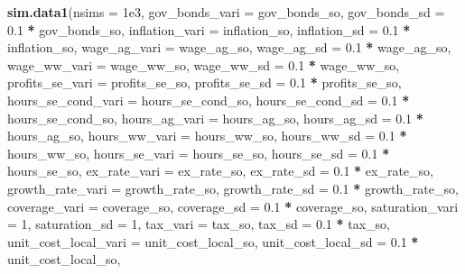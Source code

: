 \documentclass[]{article}
\newenvironment{Shaded}{\begin{snugshade}}{\end{snugshade}}
\newcommand{\DataTypeTok}[1]{\textcolor[rgb]{0.13,0.29,0.53}{#1}}
\newcommand{\DecValTok}[1]{\textcolor[rgb]{0.00,0.00,0.81}{#1}}
\newcommand{\FloatTok}[1]{\textcolor[rgb]{0.00,0.00,0.81}{#1}}
\newcommand{\KeywordTok}[1]{\textcolor[rgb]{0.13,0.29,0.53}{\textbf{#1}}}
\newcommand{\NormalTok}[1]{#1}
\newcommand{\OperatorTok}[1]{\textcolor[rgb]{0.81,0.36,0.00}{\textbf{#1}}}
\newcommand{\StringTok}[1]{\textcolor[rgb]{0.31,0.60,0.02}{#1}}
\begin{document}
\begin{Shaded}
\begin{Highlighting}[]
\KeywordTok{sim.data1}\NormalTok{(}\DataTypeTok{nsims =} \FloatTok{1e3}\NormalTok{, }
          \DataTypeTok{gov_bonds_vari =}\NormalTok{ gov_bonds_so, }
          \DataTypeTok{gov_bonds_sd =} \FloatTok{0.1} \OperatorTok{*}\StringTok{ }\NormalTok{gov_bonds_so,}
          \DataTypeTok{inflation_vari =}\NormalTok{ inflation_so,}
          \DataTypeTok{inflation_sd =} \FloatTok{0.1} \OperatorTok{*}\StringTok{ }\NormalTok{inflation_so,}
          \DataTypeTok{wage_ag_vari =}\NormalTok{ wage_ag_so,}
          \DataTypeTok{wage_ag_sd =} \FloatTok{0.1} \OperatorTok{*}\StringTok{ }\NormalTok{wage_ag_so,}
          \DataTypeTok{wage_ww_vari =}\NormalTok{ wage_ww_so,}
          \DataTypeTok{wage_ww_sd =} \FloatTok{0.1} \OperatorTok{*}\StringTok{ }\NormalTok{wage_ww_so,}
          \DataTypeTok{profits_se_vari =}\NormalTok{ profits_se_so, }
          \DataTypeTok{profits_se_sd =} \FloatTok{0.1} \OperatorTok{*}\StringTok{ }\NormalTok{profits_se_so, }
          \DataTypeTok{hours_se_cond_vari =}\NormalTok{ hours_se_cond_so, }
          \DataTypeTok{hours_se_cond_sd =} \FloatTok{0.1} \OperatorTok{*}\StringTok{ }\NormalTok{hours_se_cond_so, }
          \DataTypeTok{hours_ag_vari =}\NormalTok{ hours_ag_so, }
          \DataTypeTok{hours_ag_sd =} \FloatTok{0.1} \OperatorTok{*}\StringTok{ }\NormalTok{hours_ag_so, }
          \DataTypeTok{hours_ww_vari =}\NormalTok{ hours_ww_so,}
          \DataTypeTok{hours_ww_sd =} \FloatTok{0.1} \OperatorTok{*}\StringTok{ }\NormalTok{hours_ww_so,}
          \DataTypeTok{hours_se_vari =}\NormalTok{ hours_se_so,}
          \DataTypeTok{hours_se_sd =} \FloatTok{0.1} \OperatorTok{*}\StringTok{ }\NormalTok{hours_se_so,}
          \DataTypeTok{ex_rate_vari =}\NormalTok{ ex_rate_so,}
          \DataTypeTok{ex_rate_sd =} \FloatTok{0.1} \OperatorTok{*}\StringTok{ }\NormalTok{ex_rate_so,}
          \DataTypeTok{growth_rate_vari =}\NormalTok{ growth_rate_so,}
          \DataTypeTok{growth_rate_sd =} \FloatTok{0.1} \OperatorTok{*}\StringTok{ }\NormalTok{growth_rate_so,}
          \DataTypeTok{coverage_vari =}\NormalTok{ coverage_so,}
          \DataTypeTok{coverage_sd =} \FloatTok{0.1} \OperatorTok{*}\StringTok{ }\NormalTok{coverage_so,}
          \DataTypeTok{saturation_vari =} \DecValTok{1}\NormalTok{,}
          \DataTypeTok{saturation_sd =} \DecValTok{1}\NormalTok{,}
          \DataTypeTok{tax_vari =}\NormalTok{ tax_so, }
          \DataTypeTok{tax_sd =} \FloatTok{0.1} \OperatorTok{*}\StringTok{ }\NormalTok{tax_so, }
          \DataTypeTok{unit_cost_local_vari =}\NormalTok{ unit_cost_local_so, }
          \DataTypeTok{unit_cost_local_sd =} \FloatTok{0.1} \OperatorTok{*}\StringTok{ }\NormalTok{unit_cost_local_so, }

\end{Highlighting}
\end{Shaded}
\end{document}
